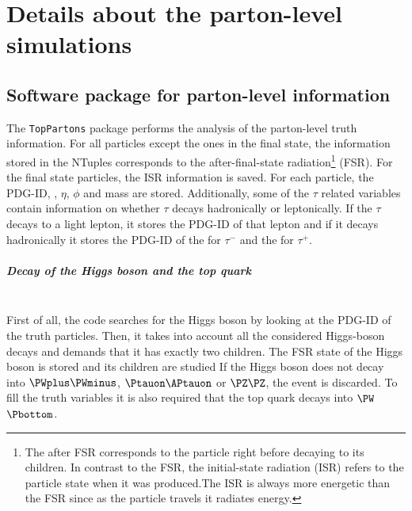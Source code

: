 \chapter{Details about the parton-level simulations}
\label{chap:Appendix:TopPartons}




\section{Software package for parton-level information}
\label{sec:ChaptH:Sig:truth:TopPartons}
The \texttt{TopPartons} package performs the analysis of the parton-level truth information.
For all particles except the ones in the final state, the information stored in the NTuples
corresponds to the after-final-state radiation\footnote{The after FSR corresponds to the
 particle right before decaying to its children. In contrast to the FSR, the initial-state radiation (ISR) refers 
 to the particle state when it was produced.The ISR is always more energetic than the FSR since as the
 particle travels it radiates energy.} (FSR).  For the final state particles, the ISR information is saved.
For each particle, the PDG-ID, \pT, $\eta$, $\phi$ and mass are stored. Additionally, some of the $\tau$ related
variables contain information on whether $\tau$ decays hadronically or leptonically.  If the $\tau$ decays to a 
light lepton, it stores the PDG-ID of that lepton and if it decays hadronically it stores the PDG-ID of the \PWm for $\tau^-$ 
and the \PWp for $\tau^+$.


\paragraph{Decay of the Higgs boson and the top quark}\mbox{}\\
First of all, the code searches for the Higgs boson by looking at the PDG-ID of the truth 
particles. Then, it takes into account all the considered Higgs-boson decays 
and demands that it has exactly two children. 
The FSR state of the Higgs boson is stored and its children are studied
If the Higgs boson does not decay into 
$\PWplus\PWminus$, $\Ptauon \APtauon$ or $\PZ\PZ$, the event is discarded. 
To fill the truth variables it is also required that the top quark decays into $\PW$$\Pbottom$.


